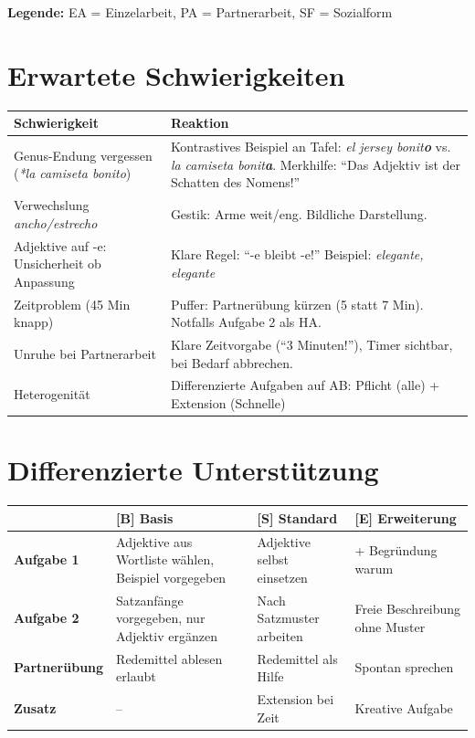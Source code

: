 \documentclass[11pt,a4paper]{article}
\newcommand{\basis}{\textcolor{basisgreen}{\textbf{[B]}}}
\newcommand{\standard}{\textcolor{standardblue}{\textbf{[S]}}}
\newcommand{\erweiterung}{\textcolor{erweiterungpurple}{\textbf{[E]}}}
\begin{document}
\textbf{Legende:} EA = Einzelarbeit, PA = Partnerarbeit, SF = Sozialform

\section{Erwartete Schwierigkeiten}

\begin{tabular}{|p{4.5cm}|p{8.5cm}|}
\hline
\textbf{Schwierigkeit} & \textbf{Reaktion} \\
\hline
Genus-Endung vergessen (\textit{*la camiseta bonito}) & Kontrastives Beispiel an Tafel: \textit{el jersey bonit\textbf{o}} vs. \textit{la camiseta bonit\textbf{a}}. Merkhilfe: ``Das Adjektiv ist der Schatten des Nomens!'' \\
\hline
Verwechslung \textit{ancho/estrecho} & Gestik: Arme weit/eng. Bildliche Darstellung. \\
\hline
Adjektive auf -e: Unsicherheit ob Anpassung & Klare Regel: ``-e bleibt -e!'' Beispiel: \textit{elegante, elegante} \\
\hline
Zeitproblem (45 Min knapp) & Puffer: Partnerübung kürzen (5 statt 7 Min). Notfalls Aufgabe 2 als HA. \\
\hline
Unruhe bei Partnerarbeit & Klare Zeitvorgabe (``3 Minuten!''), Timer sichtbar, bei Bedarf abbrechen. \\
\hline
Heterogenität & Differenzierte Aufgaben auf AB: Pflicht (alle) + Extension (Schnelle) \\
\hline
\end{tabular}

\section{Differenzierte Unterstützung}

\begin{tabular}{|l|p{4cm}|p{4cm}|p{4cm}|}
\hline
& \textbf{\basis{} Basis} & \textbf{\standard{} Standard} & \textbf{\erweiterung{} Erweiterung} \\
\hline
\textbf{Aufgabe 1} &
Adjektive aus Wortliste wählen, Beispiel vorgegeben &
Adjektive selbst einsetzen &
+ Begründung warum \\
\hline
\textbf{Aufgabe 2} &
Satzanfänge vorgegeben, nur Adjektiv ergänzen &
Nach Satzmuster arbeiten &
Freie Beschreibung ohne Muster \\
\hline
\textbf{Partnerübung} &
Redemittel ablesen erlaubt &
Redemittel als Hilfe &
Spontan sprechen \\
\hline
\textbf{Zusatz} &
-- &
Extension bei Zeit &
Kreative Aufgabe \\
\hline
\end{tabular}
\end{document}
